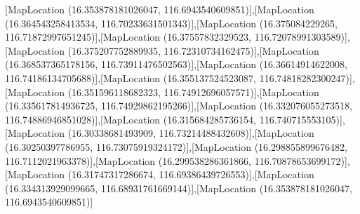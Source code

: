 [MapLocation (16.353878181026047, 116.6943540609851)],[MapLocation (16.364543258413534, 116.70233631501343)],[MapLocation (16.375084229265, 116.71872997651245)],[MapLocation (16.37557832329523, 116.72078991303589)],[MapLocation (16.375207752889935, 116.72310734162475)],[MapLocation (16.368537365178156, 116.73911476502563)],[MapLocation (16.36614914622008, 116.74186134705688)],[MapLocation (16.355137524523087, 116.74818282300247)],[MapLocation (16.351596118682323, 116.74912696057571)],[MapLocation (16.335617814936725, 116.74929862195266)],[MapLocation (16.332076055273518, 116.74886946851028)],[MapLocation (16.315684285736154, 116.740715553105)],[MapLocation (16.30338681493909, 116.73214488432608)],[MapLocation (16.30250397786955, 116.73075919324172)],[MapLocation (16.298855899676482, 116.7112021963378)],[MapLocation (16.299538286361866, 116.70878653699172)],[MapLocation (16.31747317286674, 116.69386439726553)],[MapLocation (16.334313929099665, 116.68931761669144)],[MapLocation (16.353878181026047, 116.6943540609851)]